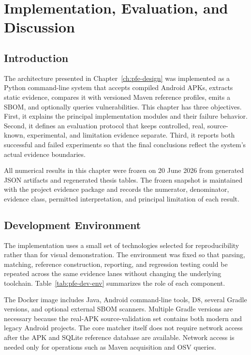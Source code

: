 \chapter{Implementation, Evaluation, and Discussion}
\label{ch:pfe-evaluation}

\section{Introduction}

The architecture presented in Chapter~\ref{ch:pfe-design} was implemented as
a Python command-line system that accepts compiled Android APKs, extracts
static evidence, compares it with versioned Maven reference profiles, emits a
\CycloneDX SBOM, and optionally queries vulnerabilities. This chapter has
three objectives. First, it explains the principal implementation modules and
their failure behavior. Second, it defines an evaluation protocol that keeps
controlled, real, source-known, experimental, and limitation evidence
separate. Third, it reports both successful and failed experiments so that the
final conclusions reflect the system's actual evidence boundaries.

All numerical results in this chapter were frozen on 20 June 2026 from
generated JSON artifacts and regenerated thesis tables. The frozen snapshot is
maintained with the project evidence package and records the numerator,
denominator, evidence class, permitted interpretation, and principal
limitation of each result.

\section{Development Environment}

The implementation uses a small set of technologies selected for
reproducibility rather than for visual demonstration. The environment was
fixed so that parsing, matching, reference construction, reporting, and
regression testing could be repeated across the same evidence lanes without
changing the underlying toolchain. Table~\ref{tab:pfe-dev-env} summarizes the
role of each component.

The Docker image includes Java, Android command-line tools, D8, several
Gradle versions, and optional external SBOM scanners. Multiple Gradle
versions are necessary because the real-APK source-validation set contains
both modern and legacy Android projects. The core matcher itself does not
require network access after the APK and SQLite reference database are
available. Network access is needed only for operations such as Maven
acquisition and OSV queries.

